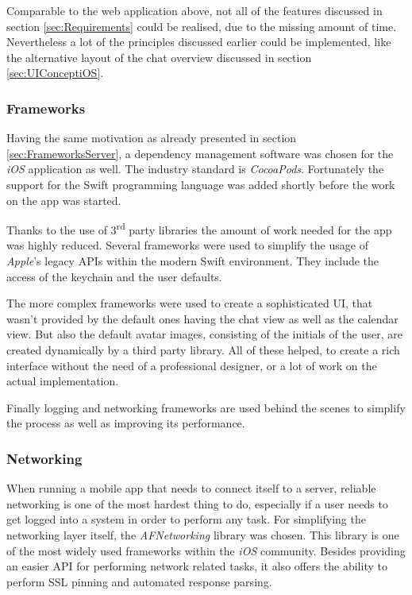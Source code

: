 Comparable to the web application above, not all of the features discussed in section \vref{sec:Requirements} could be realised, due to the missing amount of time. Nevertheless a lot of the principles discussed earlier could be implemented, like the alternative layout of the chat overview discussed in section \vref{sec:UIConceptiOS}.

\subsubsection{Frameworks}
Having the same motivation as already presented in section \vref{sec:FrameworksServer}, a dependency management software was chosen for the \emph{iOS} application as well. The industry standard is \emph{CocoaPods}. Fortunately the support for the \gls{Swift} programming language was added shortly before the work on the app was started. 

Thanks to the use of 3\textsuperscript{rd} party libraries the amount of work needed for the app was highly reduced. Several frameworks were used to simplify the usage of \emph{Apple}'s legacy \gls{API}s within the modern \gls{Swift} environment. They include the access of the keychain and the user defaults.

The more complex frameworks were used to create a sophisticated \gls{UI}, that wasn't provided by the default ones having the chat view as well as the calendar view. But also the default avatar images, consisting of the initials of the user, are created dynamically by a third party library. All of these helped, to create a rich interface without the need of a professional designer, or a lot of work on the actual implementation. 

Finally logging and networking frameworks are used behind the scenes to simplify the process as well as improving its performance.

\subsubsection{Networking}

When running a mobile app that needs to connect itself to a server, reliable networking is one of the most hardest thing to do, especially if a user needs to get logged into a system in order to perform any task. For simplifying the networking layer itself, the \emph{AFNetworking} library was chosen. This library is one of the most widely used frameworks within the \emph{iOS} community. Besides providing an easier \gls{API} for performing network related tasks, it also offers the ability to perform SSL pinning and automated response parsing.

